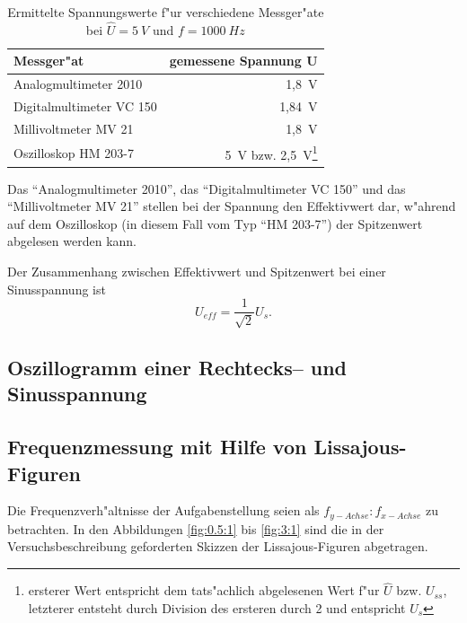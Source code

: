 \documentclass[10pt]{scrartcl}
\begin{document}
\begin{table}
\begin{minipage}[t]{\textwidth}
\begin{center}
\begin{tabular}{|lr|}
\hline
    Messger"at & gemessene Spannung U \\
\hline
     Analogmultimeter 2010 & 1,8~V \\
     Digitalmultimeter VC 150 & 1,84~V \\
     Millivoltmeter MV 21 & 1,8~V \\
     Oszilloskop HM 203-7 & 5~V bzw. 2,5~V\footnote{ersterer Wert entspricht dem tats"achlich abgelesenen Wert f"ur $\widehat{U}$ bzw. $U_{ss}$, letzterer entsteht durch Division des ersteren durch 2 und entspricht $U_s$}\\
\hline
\end{tabular}
\end{center}
\end{minipage}
\caption{Ermittelte Spannungswerte f"ur verschiedene Messger"ate bei $\widehat{U}=5~V$ und $f=1000~Hz$}
\label{table:7}
\end{table}

Das "`Analogmultimeter 2010"', das "`Digitalmultimeter VC 150"' und das "`Millivoltmeter MV 21"' stellen bei der Spannung den Effektivwert dar, w"ahrend auf dem Oszilloskop (in diesem Fall vom Typ "`HM 203-7"') der Spitzenwert abgelesen werden kann.

Der Zusammenhang zwischen Effektivwert und Spitzenwert bei einer Sinusspannung ist
\begin{displaymath}
U_{eff} = \frac{1}{\sqrt{2}} U_s.
\end{displaymath}

\subsection{Oszillogramm einer Rechtecks-- und Sinusspannung}

\subsection{Frequenzmessung mit Hilfe von Lissajous-Figuren}

\label{abschnitt:liss}

Die Frequenzverh"altnisse der Aufgabenstellung seien als $f_{y-Achse} : f_{x-Achse}$ zu betrachten. In den Abbildungen \ref{fig:0.5:1} bis \ref{fig:3:1} sind die in der Versuchsbeschreibung geforderten Skizzen der Lissajous-Figuren abgetragen.
\end{document}

